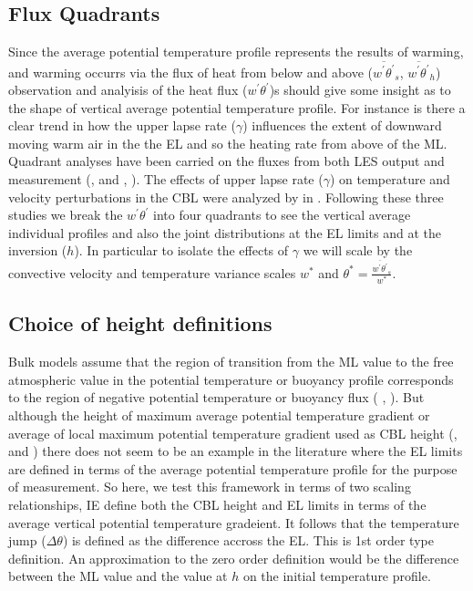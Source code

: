 \subsection{Flux Quadrants}

Since the average potential temperature profile represents the results of warming, and warming occurrs via the flux of heat from below and above ($\overline{w^{'}\theta^{'}}_{s}$, $\overline{w^{'}\theta^{'}}_{h}$) observation and analyisis of the heat flux ($w^{'}\theta^{'}$)s should give some insight as to the shape of vertical average potential temperature profile.  For instance is there a clear trend in how the upper lapse rate ($\gamma$) influences the extent of downward moving warm air in the the \acs{EL} and so the heating rate from above of the \acs{ML}. Quadrant analyses have been carried on the fluxes from both LES output and measurement (\citeauthor{SullMoengStev}, \cite{SullMoengStev} and \citeauthor{MahrtPaum}, \cite{MahrtPaum}).  The effects of upper lapse rate ($\gamma$) on temperature and velocity perturbations in the \acs{CBL} were analyzed by \citeauthor{Sorbjan} in \cite{Sorbjan}.  Following these three studies we break the $w^{'}\theta^{'}$ into four quadrants to see the vertical average individual profiles and also the joint distributions at the \acs{EL} limits and at the inversion ($h$).  In particular to isolate the effects of $\gamma$ we will scale by the convective velocity and temperature variance scales $w^{*}$ and $\theta^{*}=\frac{\overline{w^{'}\theta^{'}}_{s}}{w^{*}}$.

\subsection{Choice of height definitions}

Bulk models assume that the region of transition from the \acs{ML} value to the free atmospheric value in the potential temperature or buoyancy profile corresponds to the region of negative potential temperature or buoyancy flux (\citeauthor{Deardorff79} \cite{Deardorff79}, \citeauthor{FedConzMir04} \cite{FedConzMir04}).  But although the  height of maximum average potential temperature gradient or average of local maximum potential temperature gradient used as \acs{CBL} height (\citeauthor{SullMoengStev}, \cite{SullMoengStev} and \citeauthor{GarciaMellado} \cite{GarciaMellado}) there does not seem to be an example in the literature where the \acs{EL} limits are defined in terms of the average potential temperature profile for the purpose of measurement. So here, we test this framework in terms of two scaling relationships, IE define both the \acs{CBL} height and \acs{EL} limits in terms of the average vertical potential temperature gradeient. It follows that the temperature jump ($\Delta \theta$) is defined as the difference accross the \acs{EL}.  This is 1st order type definition.  An approximation to the zero order definition would be the difference between the \acs{ML} value and the value at $h$ on the initial temperature profile.       

